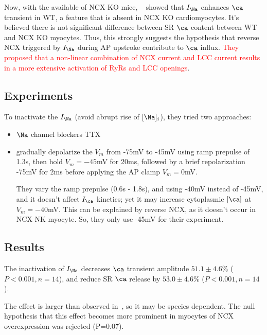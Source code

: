 Now, with the available of NCX KO mice, ~\citep{Larbig2010} showed
that $I_\Na$ enhances $\ca$ transient in WT, a feature that is absent
in NCX KO cardiomyocytes. It's believed there is not significant
difference between SR $\ca$ content between WT and NCX KO
myocytes. Thus, this strongly suggests the hypothesis that reverse NCX
triggered by $I_\Na$ during AP upstroke contribute to $\ca$ influx.
\textcolor{red}{They proposed that a non-linear combination of NCX
  current and LCC current results in a more extensive activation of
  RyRs and LCC openings}.

\subsection{Experiments}
\label{sec:experiments}

To inactivate the $I_\Na$ (avoid abrupt rise of $[\Na]_i$), they tried
two approaches:
\begin{itemize}
\item $\Na$ channel blockers TTX
\item gradually depolarize the $V_m$ from -75mV to -45mV using ramp
  prepulse of 1.3s, then hold $V_m=-45$mV for 20ms, followed by a
  brief repolarization -75mV for 2ms before applying the AP clamp
  $V_m=0$mV.

  They vary the ramp prepulse (0.6s - 1.8s), and using -40mV instead
  of -45mV, and it doesn't affect $I_\ca$ kinetics; yet it may
  increase cytoplasmic $[\ca]$ at $V_m=-40$mV. This can be explained
  by reverse NCX, as it doesn't occur in NCX NK myocyte. So, they only
  use -45mV for their experiment. 
\end{itemize}

\subsection{Results}
\label{sec:results}

The inactivation of $I_\Na$ decreases $\ca$ transient amplitude
$51.1\pm4.6\%$ ($P<0.001,n=14$), and reduce SR $\ca$ release by
$53.0\pm 4.6\%$ ($P<0.001,n=14$). 

The effect is larger than observed in~\citep{Leblanc1990}, so it may
be species dependent. The null hypothesis that this effect becomes
more prominent in myocytes of NCX overexpression was rejected
(P=0.07).

